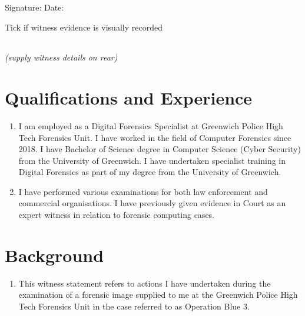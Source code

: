 \documentclass[11pt]{article}
\begin{document}
Signature: \underline{} \qquad Date: \underline{}

\bigskip\medskip

Tick if witness evidence is visually recorded \quad \begin{tabular}{|@{}p{0.25in}|} \hline
\\ \hline
\end{tabular} \quad \textit{(supply witness details on rear)}


\fontsize{11}{12}\selectfont

\section*{Qualifications and Experience}
\begin{enumerate}
    \item I am employed as a Digital Forensics Specialist at Greenwich Police High Tech Forensics Unit. I have worked in the field of Computer Forensics since 2018. I have Bachelor of Science degree in Computer Science (Cyber Security) from the University of Greenwich. I have undertaken specialist training in Digital Forensics as part of my degree from the University of Greenwich.
    \item I have performed various examinations for both law enforcement and commercial organisations.  I have previously given evidence in Court as an expert witness in relation to forensic computing cases.
\end{enumerate}

\section*{Background}
\begin{enumerate}[resume]
    \item This witness statement refers to actions I have undertaken during the examination of a forensic image supplied to me at the Greenwich Police High Tech Forensics Unit in the case referred to as Operation Blue 3.
\end{enumerate}


\newpage
{}
\fontsize{11}{12}\selectfont
\end{document}
